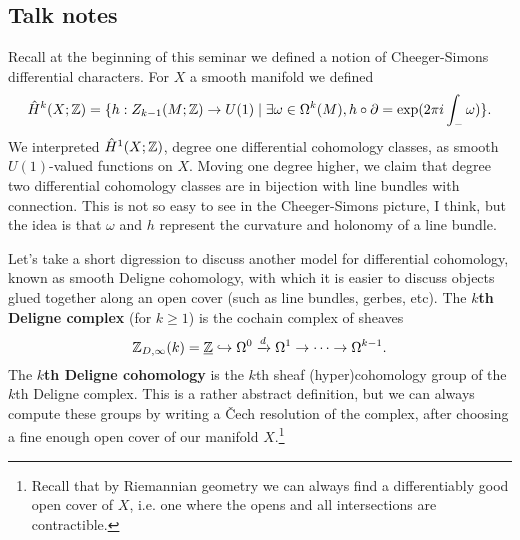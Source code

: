 \documentclass{amsart}
\begin{document}
\subsection{Talk notes}

Recall at the beginning of this seminar we defined a notion of Cheeger-Simons
differential characters. For $X$ a smooth manifold we defined
\begin{equation*}
    \hat H^k(X;\mathbb{Z}) = \{h:Z_{k-1}(M;\mathbb{Z})\to U(1) \mid \exists \omega\in\Omega^k(M), h\circ\partial = \exp(2\pi i\int_- \omega)\}.
\end{equation*}
We interpreted $\hat H^1(X;\mathbb{Z})$, degree one differential cohomology classes, as
smooth $U(1)$-valued functions on $X$. Moving one degree higher, we claim that
degree two differential cohomology classes are in bijection with line bundles with
connection.  This is not so easy
to see in the Cheeger-Simons picture, I think, but the idea is that $\omega$ and $h$
represent the curvature and holonomy of a line bundle.

Let's take a short digression to discuss another model for differential cohomology,
known as smooth Deligne cohomology, with which it is easier to discuss objects
glued together along an open cover (such as line bundles, gerbes, etc). The
\textbf{$k$th Deligne complex} (for $k\geq 1$) is the cochain complex of sheaves
\begin{equation*}
    \mathbb{Z}_{D,\infty}(k) = \underline{\mathbb{Z}} \hookrightarrow \Omega^0 \xrightarrow{d} \Omega^1 \to \cdots \to \Omega^{k-1}.
\end{equation*}
The \textbf{$k$th Deligne cohomology} is the $k$th sheaf (hyper)cohomology group
of the $k$th Deligne complex. This is a rather abstract definition, but we can always
compute these groups by writing a \v Cech resolution of the complex, after choosing
a fine enough open cover of our manifold $X$.\footnote{Recall that by Riemannian
geometry we can always find a differentiably good open cover of $X$, i.e. one
where the opens and all intersections are contractible.}
\end{document}
